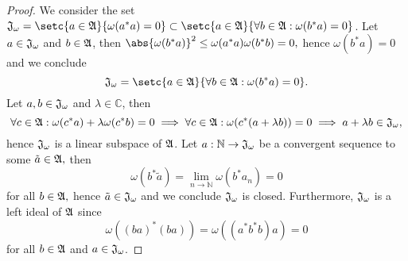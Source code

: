 \begin{proof}
    We consider the set \(\algebra{J}_\omega = \setc{a \in \algebra{A}}{\omega(a^*a) = 0} \subset \setc{a \in \algebra{A}}{\forall b \in \algebra{A} : \omega(b^*a) = 0}\). Let \(a \in \mathfrak{J}_\omega\) and \(b \in \mathfrak{A}\), then \(\abs{\omega(b^*a)}^2 \leq \omega(a^*a) \omega(b^*b) = 0,\) hence \(\omega(b^*a) = 0\) and we conclude
    \begin{equation*}
        \algebra{J}_\omega = \setc{a \in \algebra{A}}{\forall b \in \algebra{A} : \omega(b^*a) = 0}.
    \end{equation*}
    Let \(a, b \in \mathfrak{J}_\omega\) and \(\lambda \in \mathbb{C}\), then
    \begin{equation*}
        \forall c \in \mathfrak{A} : \omega(c^*a) + \lambda \omega(c^*b) = 0 \implies \forall c \in \mathfrak{A} : \omega(c^*(a + \lambda b)) = 0 \implies a + \lambda b \in \mathfrak{J}_\omega,
    \end{equation*}
    hence \(\mathfrak{J}_\omega\) is a linear subspace of \(\mathfrak{A}\). Let \(a : \mathbb{N} \to \mathfrak{J}_\omega\) be a convergent sequence to some \(\tilde{a} \in \mathfrak{A},\) then
    \begin{equation*}
        \omega(b^*\tilde{a}) = \lim_{n \to \mathbb{N}}{\omega(b^*a_n)} = 0
    \end{equation*}
    for all \(b \in \mathfrak{A},\) hence \(\tilde{a} \in \mathfrak{J}_\omega\) and we conclude \(\mathfrak{J}_\omega\) is closed. Furthermore, \(\mathfrak{J}_\omega\) is a left ideal of \(\mathfrak{A}\) since 
    \begin{equation*}
        \omega((ba)^*(ba)) = \omega((a^*b^*b)a) = 0
    \end{equation*}
    for all \(b \in \mathfrak{A}\) and \(a \in \mathfrak{J}_\omega\). 


\end{proof}
